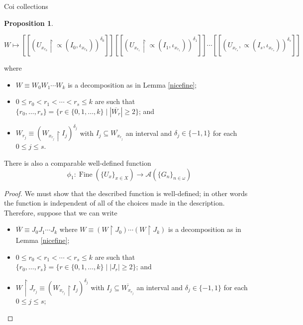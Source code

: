 \documentclass{amsart}
\theoremstyle{definition}\newtheorem{theorem}{Theorem}
\theoremstyle{definition}\newtheorem*{A}{Main Theorem}
\theoremstyle{definition}\newtheorem*{B}{Theorem \ref{elementaryequiv}}
\theoremstyle{definition}\newtheorem*{C}{Theorem \ref{continuous}}
\theoremstyle{definition}\newtheorem*{D}{Theorem \ref{bigisomorphism2}}
\theoremstyle{definition}\newtheorem{bigtheorem}{Main Theorem}
\numberwithin{theorem}{section}
\theoremstyle{definition}\newtheorem{corollary}[theorem]{Corollary}
\theoremstyle{definition}\newtheorem{proposition}[theorem]{Proposition}
\theoremstyle{definition}\newtheorem{definition}[theorem]{Definition}
\theoremstyle{definition}\newtheorem{question}[theorem]{Question}
\theoremstyle{definition}\newtheorem{example}[theorem]{Example}
\theoremstyle{definition}\newtheorem{remark}[theorem]{Remark}
\theoremstyle{definition}\newtheorem{note}[theorem]{Note}
\theoremstyle{definition}\newtheorem{lemma}[theorem]{Lemma}
\theoremstyle{definition}\newtheorem{fact}[theorem]{Fact}
\theoremstyle{definition}\newtheorem{define}[theorem]{Definition}
\theoremstyle{definition}\newtheorem{claim}[theorem]{Claim}
\theoremstyle{definition}\newtheorem{obs}[theorem]{Observation}
\theoremstyle{definition}\newtheorem{definitions}[theorem]{Definitions}
\newcommand{\Fine}{\operatorname{Fine}}
\begin{document}
\begin{section}{Coi collections}
\begin{proposition}
\begin{center}
$W \mapsto [[(U_{x_{r_0}} \upharpoonright \varpropto(I_0, \iota_{x_{r_0}}))^{\delta_0}]][[(U_{x_{r_1}} \upharpoonright \varpropto(I_1, \iota_{x_{r_1}}))^{\delta_1}]]\cdots[[(U_{x_{r_s}}, \varpropto(I_s, \iota_{x_{r_s}}))^{\delta_s}]]$

\end{center}

\noindent where

\begin{itemize}

\item $W  \equiv W_0W_1 \cdots W_k$ is a decomposition as in Lemma \ref{nicefine};

\item $0 \leq r_0 < r_1 < \cdots < r_s \leq k$ are such that $\{r_0, \ldots, r_s\} = \{r \in \{0, 1, \ldots, k\}\mid |\overline{W_r}| \geq 2\}$; and 

\item $W_{r_j} \equiv (W_{x_{r_j}} \upharpoonright I_j)^{\delta_j}$ with $I_j \subseteq \overline{W_{x_{r_j}}}$ an interval and $\delta_j \in \{-1, 1\}$ for each $0 \leq j \leq s$.

\end{itemize}

There is also a comparable well-defined function $$\phi_1: \Fine(\{U_x\}_{x \in X}) \rightarrow \mathcal{A}(\{G_n\}_{n \in \omega})$$
\end{proposition}

\begin{proof}  We must show that the described function is well-defined; in other words the function is independent of all of the choices made in the description.  Therefore, suppose that we can write

\begin{itemize}

\item $\overline{W} \equiv J_0J_1 \cdots J_k$ where $W \equiv (W \upharpoonright J_0) \cdots (W \upharpoonright J_k)$ is a decomposition as in Lemma \ref{nicefine};

\item $0 \leq r_0 < r_1 < \cdots < r_s \leq k$ are such that $\{r_0, \ldots, r_s\} = \{r \in \{0, 1, \ldots, k\}\mid |J_r| \geq 2\}$; and 

\item $W \upharpoonright J_{r_j} \equiv (W_{x_{r_j}} \upharpoonright I_j)^{\delta_j}$ with $I_j \subseteq \overline{W_{x_{r_j}}}$ an interval and $\delta_j \in \{-1, 1\}$ for each $0 \leq j \leq s$;


\end{itemize}
\end{proof}
\end{section}
\end{document}
